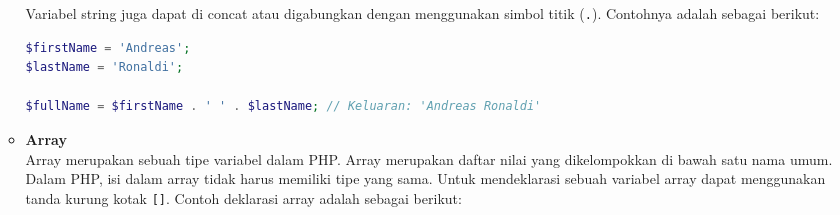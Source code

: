 \documentclass[a4paper,twoside]{article}
\begin{document}
\begin{enumerate}
\begin{itemize}
		            Variabel string juga dapat di concat atau digabungkan dengan menggunakan simbol titik (\verb|.|). Contohnya adalah sebagai berikut:

		            \begin{lstlisting}[language={php}, caption={Contoh Penggabungan String}, label={kode:5:stringconcat}]
$firstName = 'Andreas';
$lastName = 'Ronaldi';

$fullName = $firstName . ' ' . $lastName; // Keluaran: 'Andreas Ronaldi'
					\end{lstlisting}

		      \item \textbf{Array} \\
		            Array merupakan sebuah tipe variabel dalam PHP. Array merupakan daftar nilai yang dikelompokkan di bawah satu nama umum. Dalam PHP, isi dalam array tidak harus memiliki tipe yang sama. Untuk mendeklarasi sebuah variabel array dapat menggunakan tanda kurung kotak \verb|[]|. Contoh deklarasi array adalah sebagai berikut:


\end{itemize}
\end{enumerate}
\end{document}
